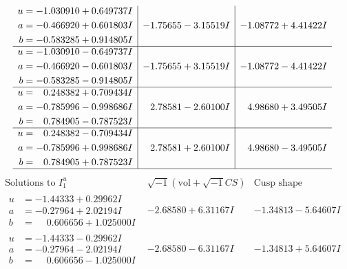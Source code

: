 \documentclass[1p]{elsarticle_modified}
\theoremstyle{definition}
\newcommand{\I}{\sqrt{-1}}
\begin{document}
$$\begin{array}{c|c|c}
\begin{aligned}
u &= -1.030910 + 0.649737 I \\
a &= -0.466920 + 0.601803 I \\
b &= -0.583285 + 0.914805 I\end{aligned}
 & -1.75655 - 3.15519 I & -1.08772 + 4.41422 I \\ \hline\begin{aligned}
u &= -1.030910 - 0.649737 I \\
a &= -0.466920 - 0.601803 I \\
b &= -0.583285 - 0.914805 I\end{aligned}
 & -1.75655 + 3.15519 I & -1.08772 - 4.41422 I \\ \hline\begin{aligned}
u &= \phantom{-}0.248382 + 0.709434 I \\
a &= -0.785996 - 0.998686 I \\
b &= \phantom{-}0.784905 - 0.787523 I\end{aligned}
 & \phantom{-}2.78581 - 2.60100 I & \phantom{-}4.98680 + 3.49505 I \\ \hline\begin{aligned}
u &= \phantom{-}0.248382 - 0.709434 I \\
a &= -0.785996 + 0.998686 I \\
b &= \phantom{-}0.784905 + 0.787523 I\end{aligned}
 & \phantom{-}2.78581 + 2.60100 I & \phantom{-}4.98680 - 3.49505 I\\
 \hline 
 \end{array}$$\newpage$$\begin{array}{c|c|c}  
\text{Solutions to }I^u_{1}& \I (\text{vol} + \sqrt{-1}CS) & \text{Cusp shape}\\
 \hline 
\begin{aligned}
u &= -1.44333 + 0.29962 I \\
a &= -0.27964 + 2.02194 I \\
b &= \phantom{-}0.606656 + 1.025000 I\end{aligned}
 & -2.68580 + 6.31167 I & -1.34813 - 5.64607 I \\ \hline\begin{aligned}
u &= -1.44333 - 0.29962 I \\
a &= -0.27964 - 2.02194 I \\
b &= \phantom{-}0.606656 - 1.025000 I\end{aligned}
 & -2.68580 - 6.31167 I & -1.34813 + 5.64607 I \\ \hline\begin{aligned}

\end{aligned}
\end{array}$$
\end{document}
